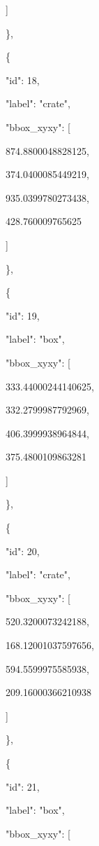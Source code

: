 \documentclass[10pt,a4paper]{article}
\begin{document}
      ]\par
    \},\allowbreak{}\par
    \{\par
      "id":\allowbreak{} 18,\allowbreak{}\par
      "label":\allowbreak{} "crate",\allowbreak{}\par
      "bbox\_xyxy":\allowbreak{} [\par
        874.8800048828125,\allowbreak{}\par
        374.0400085449219,\allowbreak{}\par
        935.0399780273438,\allowbreak{}\par
        428.760009765625\par
      ]\par
    \},\allowbreak{}\par
    \{\par
      "id":\allowbreak{} 19,\allowbreak{}\par
      "label":\allowbreak{} "box",\allowbreak{}\par
      "bbox\_xyxy":\allowbreak{} [\par
        333.44000244140625,\allowbreak{}\par
        332.2799987792969,\allowbreak{}\par
        406.3999938964844,\allowbreak{}\par
        375.4800109863281\par
      ]\par
    \},\allowbreak{}\par
    \{\par
      "id":\allowbreak{} 20,\allowbreak{}\par
      "label":\allowbreak{} "crate",\allowbreak{}\par
      "bbox\_xyxy":\allowbreak{} [\par
        520.3200073242188,\allowbreak{}\par
        168.12001037597656,\allowbreak{}\par
        594.5599975585938,\allowbreak{}\par
        209.16000366210938\par
      ]\par
    \},\allowbreak{}\par
    \{\par
      "id":\allowbreak{} 21,\allowbreak{}\par
      "label":\allowbreak{} "box",\allowbreak{}\par
      "bbox\_xyxy":\allowbreak{} [\par
\end{document}
